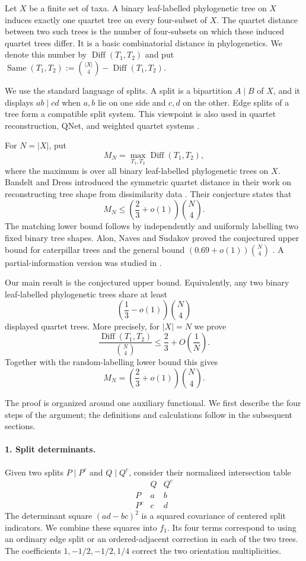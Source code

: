 \documentclass[11pt]{article}
\newcommand{\Same}{\operatorname{Same}}
\newcommand{\Diff}{\operatorname{Diff}}
\begin{document}
Let $X$ be a finite set of taxa.  A binary leaf-labelled phylogenetic tree
on $X$ induces exactly one quartet tree on every four-subset of $X$.  The
quartet distance between two such trees is the number of four-subsets on
which these induced quartet trees differ.  It is a basic combinatorial
distance in phylogenetics.  We denote this number by
$\Diff(T_1,T_2)$ and put
$\Same(T_1,T_2):=\binom{|X|}{4}-\Diff(T_1,T_2)$.

We use the standard language of splits.  A split is a bipartition
$A\mid B$ of $X$, and it displays $ab\mid cd$ when $a,b$ lie on one side
and $c,d$ on the other.  Edge splits of a tree form a compatible split
system.  This viewpoint is also used in quartet reconstruction, QNet, and
weighted quartet systems
\cite{GrunewaldForslundDressMoulton2007,GrunewaldHuberMoultonSemple2008,Grunewald2010}.

For $N=|X|$, put
\[
M_N=\max_{T_1,T_2}\Diff(T_1,T_2),
\]
where the maximum is over all binary leaf-labelled phylogenetic trees on
$X$.  Bandelt and Dress introduced the symmetric quartet distance in their
work on reconstructing tree shape from dissimilarity data
\cite{BandeltDress1986}.  Their conjecture states that
\[
M_N\le \left(\frac23+o(1)\right)\binom N4.
\]
The matching lower bound follows by independently and uniformly labelling
two fixed binary tree shapes.  Alon, Naves and Sudakov proved the conjectured
upper bound for caterpillar trees and the general bound
$(0.69+o(1))\binom N4$ \cite{AlonNavesSudakov2016}.  A partial-information
version was studied in \cite{SnirWeissbergYuster2022}.

Our main result is the conjectured upper bound.  Equivalently, any two binary
leaf-labelled phylogenetic trees share at least
\[
\left(\frac13-o(1)\right)\binom N4
\]
displayed quartet trees.  More precisely, for $|X|=N$ we prove
\[
\frac{\Diff(T_1,T_2)}{\binom N4}\le \frac23+O\left(\frac1N\right).
\]
Together with the random-labelling lower bound this gives
\[
M_N=\left(\frac23+o(1)\right)\binom N4.
\]

The proof is organized around one auxiliary functional.  We first describe
the four steps of the argument; the definitions and calculations follow in
the subsequent sections.

\paragraph{1. Split determinants.}
Given two splits $P\mid P^c$ and $Q\mid Q^c$, consider their normalized
intersection table
\[
\begin{array}{c|cc}
&Q&Q^c\\
\hline
P&a&b\\
P^c&c&d
\end{array}
\]
The determinant square $(ad-bc)^2$ is a squared covariance of centered split
indicators.  We combine these squares into $f_1$.  Its four terms correspond
to using an ordinary edge split or an ordered-adjacent correction in each of
the two trees.  The coefficients $1,-1/2,-1/2,1/4$ correct the two orientation
multiplicities.
\end{document}
